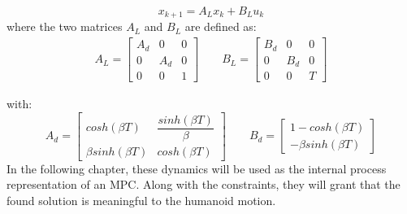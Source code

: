 \begin{equation}
    x_{k+1} = A_{L}x_{k} + B_{L}u_{k}
\end{equation}
where the two matrices $A_L$ and $B_L$ are defined as:
\begin{align}
    A_{L} = 
    \begin{bmatrix}
        A_{d} & 0 & 0 \\
        0 & A_{d} & 0 \\
        0 & 0 & 1
    \end{bmatrix}
    \qquad
    B_{L} = 
    \begin{bmatrix}
        B_{d} & 0 & 0 \\
        0 & B_{d} & 0 \\
        0 & 0 & T
    \end{bmatrix}
\end{align}

with:
\begin{equation}
    A_{d} = 
    \begin{bmatrix}
        cosh(\beta T) & \dfrac{sinh(\beta T)}{\beta} \\
        \beta sinh(\beta T) & cosh(\beta T)
    \end{bmatrix}
    \qquad
    B_{d} = 
    \begin{bmatrix}
        1 - cosh(\beta T) \\
        - \beta sinh(\beta T)
    \end{bmatrix}
\end{equation}
In the following chapter, these dynamics will be used as the internal process representation of an MPC. Along with the constraints, they will grant that the found solution is meaningful to the humanoid motion.